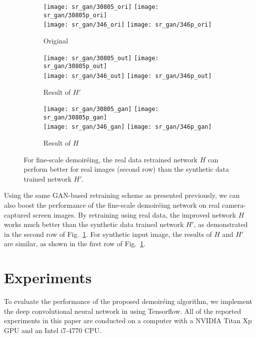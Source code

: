 \documentclass[10pt,twocolumn,letterpaper]{article}
\begin{document}
\begin{figure}
  \centering
  \begin{subfigure}{0.32\linewidth}
    \texttt{[image: sr\_gan/30805\_ori]}
    \texttt{[image: sr\_gan/30805p\_ori]}
    \\[1ex]
    \texttt{[image: sr\_gan/346\_ori]}
    \texttt{[image: sr\_gan/346p\_ori]}
    \caption{Original}
  \end{subfigure}
  \begin{subfigure}{0.32\linewidth}
    \texttt{[image: sr\_gan/30805\_out]}
    \texttt{[image: sr\_gan/30805p\_out]}
    \\[1ex]
    \texttt{[image: sr\_gan/346\_out]}
    \texttt{[image: sr\_gan/346p\_out]}
    \caption{Result of $H'$}
  \end{subfigure}
  \begin{subfigure}{0.32\linewidth}
    \texttt{[image: sr\_gan/30805\_gan]}
    \texttt{[image: sr\_gan/30805p\_gan]}
    \\[1ex]
    \texttt{[image: sr\_gan/346\_gan]}
    \texttt{[image: sr\_gan/346p\_gan]}
    \caption{Result of $H$}
  \end{subfigure}

  \caption{For fine-scale demoir\'eing, the real data retrained
    network $H$ can perform better for real images (second row) than
    the synthetic data trained network $H'$.}

  \label{fig:exp_srgan}
\end{figure}

Using the same GAN-based retraining scheme as presented previously, we
can also boost the performance of the fine-scale demoir\'eing network
on real camera-captured screen images.  By retraining using real data,
the improved network $H$ works much better than the synthetic data
trained network $H'$, as demonstrated in the second row of
Fig.~\ref{fig:exp_srgan}.  For synthetic input image, the results of
$H$ and $H'$ are similar, as shown in the first row of
Fig.~\ref{fig:exp_srgan}.


\section{Experiments}
\label{sec:result}

To evaluate the performance of the proposed demoir\'eing algorithm, we
implement the deep convolutional neural network in using Tensorflow.
All of the reported experiments in this paper are conducted on a
computer with a NVIDIA Titan Xp GPU and an Intel i7-4770 CPU.
\end{document}
